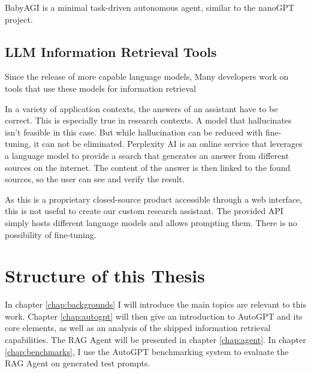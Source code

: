 \documentclass[../main.tex]{subfiles}
\begin{document}
BabyAGI is a minimal task-driven autonomous agent, similar to the nanoGPT project.


\subsection{LLM Information Retrieval Tools}

Since the release of more capable language models,
Many developers work on tools that use these models for information retrieval

In a variety of application contexts,
the answers of an assistant have to be correct.
This is especially true in research contexts.
A model that hallucinates isn't feasible in this case.
But while hallucination can be reduced with fine-tuning,
it can not be eliminated.
Perplexity AI is an online service that leverages a language model
to provide a search that generates an answer from different sources on the internet.
The content of the answer is then linked to the found sources,
so the user can see and verify the result.

As this is a proprietary closed-source product accessible through a web interface,
this is not useful to create our custom research assistant.
The provided API simply hosts different language models and allows prompting them.
There is no possibility of fine-tuning.

\section{Structure of this Thesis}

In chapter \ref{chap:backgrounds} I will introduce the main topics
are relevant to this work.
Chapter \ref{chap:autogpt} will then give an introduction to AutoGPT and its
core elements,
as well as an analysis of the shipped information retrieval capabilities.
The RAG Agent will be presented in chapter \ref{chap:agent}.
In chapter \ref{chap:benchmarks}, I use the AutoGPT benchmarking system
to evaluate the RAG Agent on generated test prompts.
\end{document}
